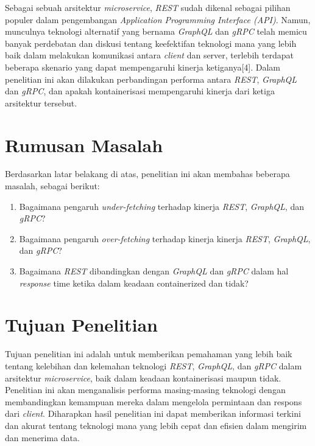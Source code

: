 Sebagai sebuah arsitektur \textit{microservice}, \textit{REST} sudah dikenal sebagai pilihan populer dalam pengembangan \textit{Application Programming Interface (API)}. Namun, munculnya teknologi alternatif yang bernama \textit{GraphQL} dan \textit{gRPC} telah memicu banyak perdebatan dan diskusi tentang keefektifan teknologi mana yang lebih baik dalam melakukan komunikasi antara \textit{client} dan server, terlebih terdapat beberapa skenario yang dapat mempengaruhi kinerja ketiganya[4]. 
Dalam penelitian ini akan dilakukan perbandingan performa antara \textit{REST}, \textit{GraphQL} dan \textit{gRPC}, dan apakah kontainerisasi mempengaruhi kinerja dari ketiga arsitektur tersebut.\\


\section{Rumusan Masalah}
Berdasarkan latar belakang di atas, penelitian ini akan membahas beberapa masalah, sebagai berikut: 
\begin{enumerate}[nolistsep,leftmargin=0.5cm]
  \item Bagaimana pengaruh \textit{under-fetching} terhadap kinerja \textit{REST}, \textit{GraphQL}, dan \textit{gRPC}?
  \item Bagaimana pengaruh \textit{over-fetching} terhadap kinerja kinerja \textit{REST}, \textit{GraphQL}, dan \textit{gRPC}?
  \item Bagaimana \textit{REST} dibandingkan dengan \textit{GraphQL} dan \textit{gRPC} dalam hal \textit{response} time ketika dalam keadaan containerized  dan tidak?
\\
\end{enumerate}

\section{Tujuan Penelitian}
Tujuan penelitian ini adalah untuk memberikan pemahaman yang lebih baik tentang kelebihan dan kelemahan teknologi \textit{REST}, \textit{GraphQL}, dan \textit{gRPC} dalam arsitektur \textit{microservice}, baik dalam keadaan kontainerisasi maupun tidak. Penelitian ini akan menganalisis performa masing-masing teknologi dengan membandingkan kemampuan mereka dalam mengelola permintaan dan respons dari \textit{client}. Diharapkan hasil penelitian ini dapat memberikan informasi terkini dan akurat tentang teknologi mana yang lebih cepat dan efisien dalam mengirim dan menerima data.
\\

